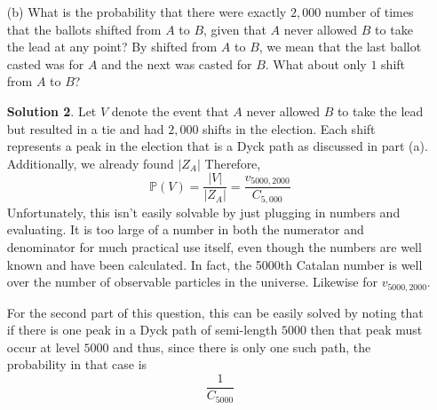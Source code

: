 \documentclass[12pt]{article}
\theoremstyle{definition}
\numberwithin{equation}{section}
\newtheorem{solution}{Solution}
\newcommand{\Pro}{\ensuremath{\mathbb{P}}}
\begin{document}
\begin{itemize}[leftmargin=20pt]
\begin{solution}
    $|Z_A|$ is the total number of simple random walks that terminate at $0$ where $S_i\geq 0$ for all $i=0,1,2,\ldots, m$. In other words, it is a simple random walk that ends at $0$ where at no point in time $i$ are there more down steps (ballots for $B$) than there are up steps. This is a Dyck path of semi-length $n$. Thus,
    \begin{gather*}
        |Z_A| = C_n = \frac{1}{n+1}\binom{2n}{n}
    \end{gather*}
    and we have that,
    \begin{gather*}
        \Pro(Z) = 2\frac{|Z_A|}{|\Omega|} = 2\frac{C_n}{\binom{2n}{n}} = 2\frac{1}{n+1} = \frac{2}{5001} \\ \\
        \Pro(Z) \approx 0.03999 \%
    \end{gather*}
    
    \end{solution}
    
    \item[(b)] What is the probability that there were exactly $2,000$ number of times that the ballots shifted from $A$ to $B$, given that $A$ never allowed $B$ to take the lead at any point? By shifted from $A$ to $B$, we mean that the last ballot casted was for $A$ and the next was casted for $B$. What about only $1$ shift from $A$ to $B$?

    \begin{solution}
        Let $V$ denote the event that $A$ never allowed $B$ to take the lead but resulted in a tie and had $2,000$ shifts in the election. Each shift represents a peak in the election that is a Dyck path as discussed in part (a). Additionally, we already found $|Z_A|$ Therefore,
        \begin{equation*}
            \Pro(V) = \frac{|V|}{|Z_A|} = \frac{v_{5000, 2000}}{C_{5,000}}
        \end{equation*}
        Unfortunately, this isn't easily solvable by just plugging in numbers and evaluating. It is too large of a number in both the numerator and denominator for much practical use itself, even though the numbers are well known and have been calculated. In fact, the 5000th Catalan number is well over the number of observable particles in the universe. Likewise for $v_{5000,2000}$. 
        
        For the second part of this question, this can be easily solved by noting that if there is one peak in a Dyck path of semi-length $5000$ then that peak must occur at level $5000$ and thus, since there is only one such path, the probability in that case is
        \begin{equation*}
            \frac{1}{C_{5000}}
        \end{equation*}
    \end{solution}
    
    
\end{itemize}
\end{document}
